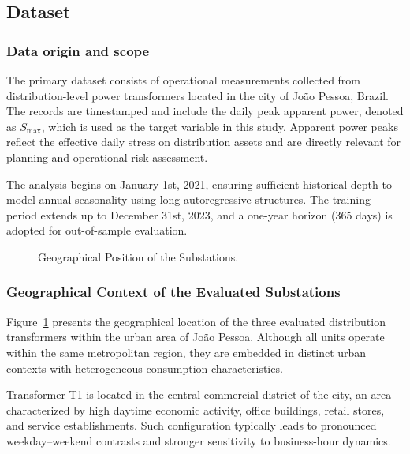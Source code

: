 \subsection{Dataset}
\label{subsec:dataset}

\subsubsection{Data origin and scope}
The primary dataset consists of operational measurements collected from distribution-level power transformers located in the city of João Pessoa, Brazil. The records are timestamped and include the daily peak apparent power, denoted as $S_{\max}$, which is used as the target variable in this study. Apparent power peaks reflect the effective daily stress on distribution assets and are directly relevant for planning and operational risk assessment.

The analysis begins on January 1st, 2021, ensuring sufficient historical depth to model annual seasonality using long autoregressive structures. The training period extends up to December 31st, 2023, and a one-year horizon (365 days) is adopted for out-of-sample evaluation.

\begin{figure}
    \centering
    
    \caption{Geographical Position of the Substations.}
    \label{fig:map_substations}
\end{figure}

\subsubsection{Geographical Context of the Evaluated Substations}

Figure~\ref{fig:map_substations} presents the geographical location of the three evaluated distribution transformers within the urban area of João Pessoa. Although all units operate within the same metropolitan region, they are embedded in distinct urban contexts with heterogeneous consumption characteristics.

Transformer T1 is located in the central commercial district of the city, an area characterized by high daytime economic activity, office buildings, retail stores, and service establishments. Such configuration typically leads to pronounced weekday–weekend contrasts and stronger sensitivity to business-hour dynamics.

